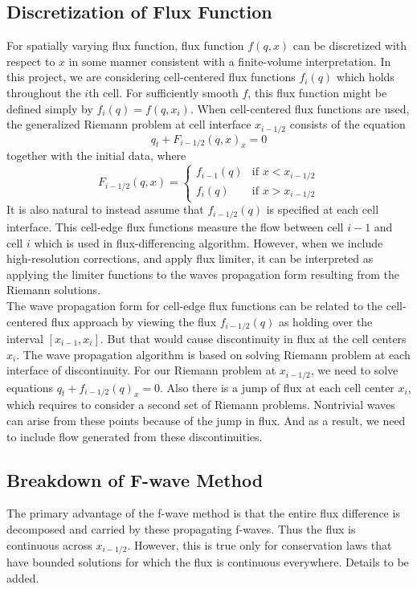 \documentclass{article}
\begin{document}
\subsection{Discretization of Flux Function}
	For spatially varying flux function, flux function $f(q,x)$ can be discretized with respect to $x$ in some manner consistent with a finite-volume interpretation. In this project, we are considering cell-centered flux functions $f_i(q)$ which holds throughout the $i$th cell. For sufficiently smooth $f$, this flux function might be defined simply by $f_i(q)=f(q,x_i)$. When cell-centered flux functions are used, the generalized Riemann problem at cell interface $x_{i-1/2}$ consists of the equation
	\[
	q_t + F_{i-1/2}(q,x)_x=0
	\]    
	together with the initial data, where
	\[
	F_{i-1/2}(q,x)=\begin{cases}f_{i-1}(q) & \text{if } x<x_{i-1/2}\\
	f_i(q) & \text{if } x>x_{i-1/2}\end{cases}
	\]
	It is also natural to instead assume that $f_{i-1/2}(q)$ is specified at each cell interface. This cell-edge flux functions measure the flow between cell $i-1$ and cell $i$ which is used in flux-differencing algorithm. However, when we include high-resolution corrections, and apply flux limiter, it can be interpreted as applying the limiter functions to the waves propagation form resulting from the Riemann solutions.\\
	
	\noindent The wave propagation form for cell-edge flux functions can be related to the cell-centered flux approach by viewing the flux $f_{i-1/2}(q)$ as holding over the interval $[x_{i-1},x_i]$. But that would cause discontinuity in flux at the cell centers $x_i$. The wave propagation algorithm is based on solving Riemann problem at each interface of discontinuity. For our Riemann problem at $x_{i-1/2}$, we need to solve equations $q_t+f_{i-1/2}(q)_x=0$. Also there is a jump of flux at each cell center $x_i$, which requires to consider a second set of Riemann problems. Nontrivial waves can arise from these points because of the jump in flux. And as a result, we need to include flow generated from these discontinuities.
\subsection{Breakdown of F-wave Method}
The primary advantage of the f-wave method is that the entire flux difference is decomposed and carried by these propagating f-waves. Thus the flux is continuous across $x_{i-1/2}$. However, this is true only for conservation laws that have bounded solutions for which the flux is continuous everywhere. Details to be added.
	
\end{document}
